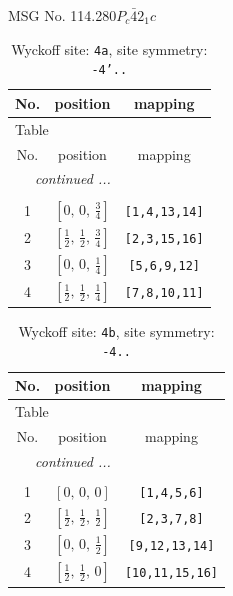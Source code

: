 \documentclass[fleqn,8pt]{jsarticle}
\begin{document}
\setcounter{MaxMatrixCols}{32}

\renewcommand{\tablename}{Table~}
\renewcommand{\figurename}{Figure~}
\begin{center}
\LARGE
MSG No. 114.280\quad$P_{c}\bar{4}2_{1}c$
\end{center}
\renewcommand{\arraystretch}{1.2}
\begin{longtable}{ccc}
\caption{Wyckoff site: {\tt 4a}, site symmetry: {\tt -4'..}}
 \\
 \hline \hline
No. & position & mapping \\ \hline \endfirsthead

\multicolumn{2}{l}{\tablename\ \thetable{}} \\
 \hline \hline
No. & position & mapping \\ \hline \endhead

 \hline \hline
\multicolumn{2}{r}{\footnotesize\it continued ...} \\ \endfoot

 \hline \hline
\multicolumn{2}{r}{} \\ \endlastfoot

1 & $\left[ 0,\, 0,\, \frac{3}{4} \right]$ & {\tt [1,4,13,14]} \\ \hline
2 & $\left[ \frac{1}{2},\, \frac{1}{2},\, \frac{3}{4} \right]$ & {\tt [2,3,15,16]} \\ \hline
3 & $\left[ 0,\, 0,\, \frac{1}{4} \right]$ & {\tt [5,6,9,12]} \\ \hline
4 & $\left[ \frac{1}{2},\, \frac{1}{2},\, \frac{1}{4} \right]$ & {\tt [7,8,10,11]} \\
\end{longtable}
\renewcommand{\arraystretch}{1.2}
\begin{longtable}{ccc}
\caption{Wyckoff site: {\tt 4b}, site symmetry: {\tt -4..}}
 \\
 \hline \hline
No. & position & mapping \\ \hline \endfirsthead

\multicolumn{2}{l}{\tablename\ \thetable{}} \\
 \hline \hline
No. & position & mapping \\ \hline \endhead

 \hline \hline
\multicolumn{2}{r}{\footnotesize\it continued ...} \\ \endfoot

 \hline \hline
\multicolumn{2}{r}{} \\ \endlastfoot

1 & $\left[ 0,\, 0,\, 0 \right]$ & {\tt [1,4,5,6]} \\ \hline
2 & $\left[ \frac{1}{2},\, \frac{1}{2},\, \frac{1}{2} \right]$ & {\tt [2,3,7,8]} \\ \hline
3 & $\left[ 0,\, 0,\, \frac{1}{2} \right]$ & {\tt [9,12,13,14]} \\ \hline
4 & $\left[ \frac{1}{2},\, \frac{1}{2},\, 0 \right]$ & {\tt [10,11,15,16]} \\
\end{longtable}
\end{document}
